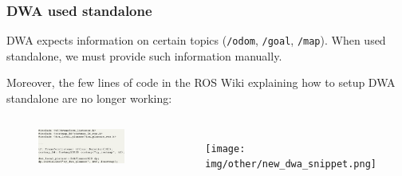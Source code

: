 \documentclass{beamer}
\begin{document}

\begin{frame}
\frametitle{DWA used standalone}

DWA expects information on certain topics (\texttt{/odom}, \texttt{/goal},
\texttt{/map}).
When used standalone, we must provide such information manually.

\vspace{2em}

Moreover, the few lines of code in the ROS Wiki explaining how to setup DWA
standalone are no longer working:

\begin{columns}


\vspace{-1.5em}

\begin{figure}[H]
    \centering
    \includegraphics[scale=0.22]{img/other/old_dwa_snippet.png}
\end{figure}


\begin{figure}[H]
    \centering
    \texttt{[image: img/other/new\_dwa\_snippet.png]}
\end{figure}

\end{columns}

\end{frame}

\end{document}
